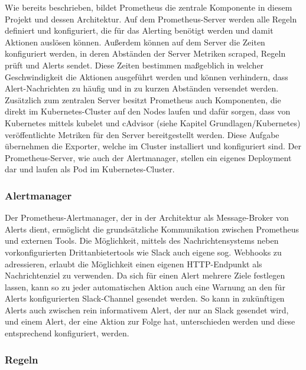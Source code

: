 \documentclass[a4paper,10pt]{scrartcl}
\begin{document}
Wie bereits beschrieben, bildet Prometheus die zentrale Komponente in diesem Projekt und dessen Architektur. Auf dem Prometheus-Server werden alle Regeln definiert und konfiguriert, die für das Alerting benötigt werden und damit Aktionen auslösen können. Außerdem können auf dem Server die Zeiten konfiguriert werden, in deren Abständen der Server Metriken scraped, Regeln prüft und Alerts sendet. Diese Zeiten bestimmen maßgeblich in welcher Geschwindigkeit die Aktionen ausgeführt werden und können verhindern, dass Alert-Nachrichten zu häufig und in zu kurzen Abständen versendet werden.\\

Zusätzlich zum zentralen Server besitzt Prometheus auch Komponenten, die direkt im Kubernetes-Cluster auf den Nodes laufen und dafür sorgen, dass von Kubernetes mittels kubelet und cAdvisor (siehe Kapitel Grundlagen/Kubernetes) veröffentlichte Metriken für den Server bereitgestellt werden. Diese Aufgabe übernehmen die Exporter, welche im Cluster installiert und konfiguriert sind.
Der Prometheus-Server, wie auch der Alertmanager, stellen ein eigenes Deployment dar und laufen als Pod im Kubernetes-Cluster. 

\subsubsection{Alertmanager}

Der Prometheus-Alertmanager, der in der Architektur als Message-Broker von Alerts dient, ermöglicht die grundsätzliche Kommunikation zwischen Prometheus und externen Tools. Die Möglichkeit, mittels des Nachrichtensystems neben vorkonfigurierten Drittanbietertools wie Slack auch eigene sog. Webhooks zu adressieren, erlaubt die Möglichkeit einen eigenen HTTP-Endpunkt als Nachrichtenziel zu verwenden. Da sich für einen Alert mehrere Ziele festlegen lassen, kann so zu jeder automatischen Aktion auch eine Warnung an den für Alerts konfigurierten Slack-Channel gesendet werden. So kann in zukünftigen Alerts auch zwischen rein informativem Alert, der nur an Slack gesendet wird, und einem Alert, der eine Aktion zur Folge hat, unterschieden werden und diese entsprechend konfiguriert, werden.\\

\subsubsection{Regeln}
\end{document}

